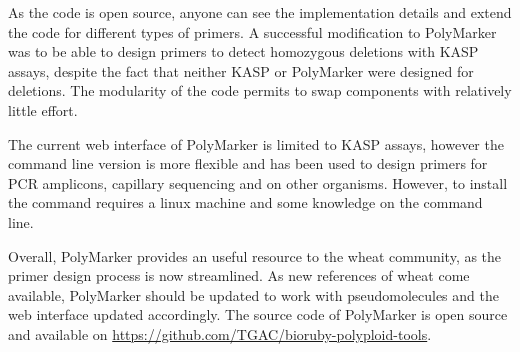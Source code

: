 As the code is open source, anyone can see the implementation details and extend the code for different types of primers. 
A successful modification to PolyMarker was to be able to design primers to detect homozygous deletions with KASP assays, despite the fact that neither KASP or PolyMarker were designed for deletions. 
The modularity of the code permits to swap components with relatively little effort. 

The current web interface of PolyMarker is limited to KASP assays, however the command line version is more flexible and has been used to design primers for PCR amplicons, capillary sequencing and on other organisms. 
However, to install the command requires a linux machine and some knowledge on the command line. 

Overall, PolyMarker provides an useful resource to the wheat community, as the primer design process is now streamlined. 
As new references of wheat come available, PolyMarker should be updated to work with pseudomolecules and the web interface updated accordingly. The source code of PolyMarker is open source and available on \url{https://github.com/TGAC/bioruby-polyploid-tools}. 